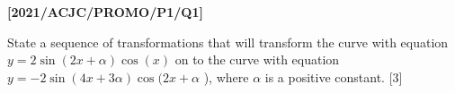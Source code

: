 \item \textbf{{[}2021/ACJC/PROMO/P1/Q1{]} }

State a sequence of transformations that will transform the curve
with equation $y=2\sin(2x+\alpha)\cos(x)$ on to the curve with equation
$y=-2\sin(4x+3\alpha)\cos(2x+\alpha$ ), where $\alpha$ is a positive
constant. \hfill{}{[}3{]}
